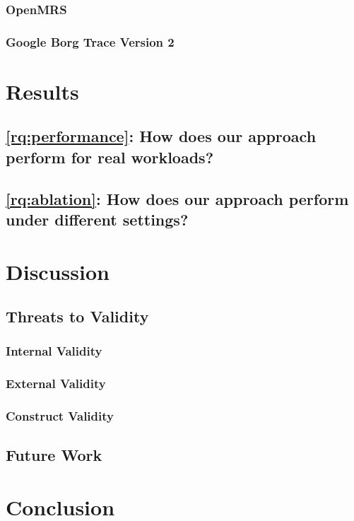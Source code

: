 \subsubsection{OpenMRS}

\subsubsection{Google Borg Trace Version 2}

\section{Results}\label{sec:results}

\subsection*{\cref{rq:performance}: How does our approach perform for real workloads?}

\subsection*{\cref{rq:ablation}: How does our approach perform under different settings?}

\section{Discussion}\label{sec:discussion}

\subsection{Threats to Validity}

\subsubsection{Internal Validity}

\subsubsection{External Validity}

\subsubsection{Construct Validity}

\subsection{Future Work}

\section{Conclusion}\label{sec:conclusion}

\printbibliography

